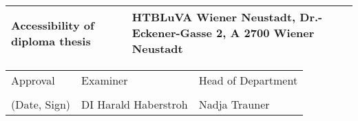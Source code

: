 \begin{center}
    \vspace{5mm}
    
    
    \vspace{5mm}
    
    \begin{tabular}{| m{8cm} | m{8cm} |}
        \hline
        Accessibility of diploma thesis & HTBLuVA Wiener Neustadt, Dr.-Eckener-Gasse 2, A 2700 Wiener Neustadt\\ 
        \hline
    \end{tabular}
    
    \vspace{5mm}
    
    \begin{tabular}{| m{5cm} | m{6cm} | m{5cm} |}
        \hline
        Approval & Examiner & Head of Department\\
        &&\\
        (Date, Sign) & DI Harald Haberstroh & Nadja Trauner\\ %
        \hline
    \end{tabular}
    
    \end{center}
